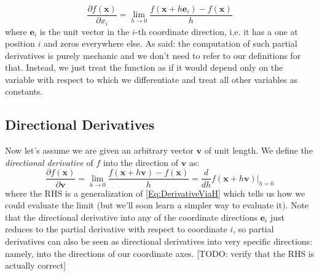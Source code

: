 \begin{equation}
 \frac{\partial f(\mathbf{x}) }{\partial x_i} 
 = \lim_{h \rightarrow 0} \frac{f(\mathbf{x} + h \mathbf{e}_i ) - f(\mathbf{x})}{h}
\end{equation}
where $\mathbf{e}_i$ is the unit vector in the $i$-th coordinate direction, i.e. it has a one at position $i$ and zeros everywhere else. As said: the computation of such partial derivatives is purely mechanic and we don't need to refer to our definitions for that. Instead, we just treat the function as if it would depend only on the variable with respect to which we differentiate and treat all other variables as constants.

\subsection{Directional Derivatives}
Now let's assume we are given an arbitrary vector $\mathbf{v}$ of unit length. We define the \emph{directional derivative} of $f$ into the direction of  $\mathbf{v}$ as:
\begin{equation}
\label{Eq:DirectionalDerivative}
 \frac{\partial f(\mathbf{x}) }{\partial \mathbf{v}} 
 = \lim_{h \rightarrow 0} \frac{f(\mathbf{x} + h \mathbf{v} ) - f(\mathbf{x})}{h}
 = \frac{d}{d h} f(\mathbf{x} + h \mathbf{v}) \bigg\rvert_{h=0}
\end{equation}
where the RHS is a generalization of \ref{Eq:DerivativeViaH} which tells us how we could evaluate the limit (but we'll soon learn a simpler way to evaluate it). Note that the directional derivative into any of the coordinate directions $\mathbf{e}_i$ just reduces to the partial derivative with respect to coordinate $i$, so partial derivatives can also be seen as directional derivatives into very specific directions: namely, into the directions of our coordinate axes. [TODO: verify that the RHS is actually correct] 


